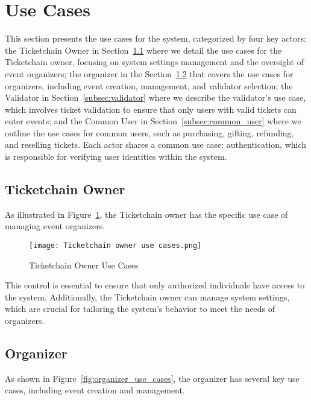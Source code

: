 \section{Use Cases}
\label{sec:use_cases}

This section presents the use cases for the system, categorized by four key
actors: the Ticketchain Owner in Section~\ref{subsec:ticketchain_owner} where
we detail the use cases for the Ticketchain owner, focusing on system settings
management and the oversight of event organizers; the organizer in the
Section~\ref{subsec:organizer} that covers the use cases for organizers,
including event creation, management, and validator selection; the Validator in
Section~\ref{subsec:validator} where we describe the validator's use case,
which involves ticket validation to ensure that only users with valid tickets
can enter events; and the Common User in Section~\ref{subsec:common_user} where
we outline the use cases for common users, such as purchasing, gifting,
refunding, and reselling tickets. Each actor shares a common use case:
authentication, which is responsible for verifying user identities within the
system.

\subsection{Ticketchain Owner}
\label{subsec:ticketchain_owner}

As illustrated in Figure~\ref{fig:ticketchain_owner_use_cases}, the Ticketchain
owner has the specific use case of managing event organizers.

\begin{figure}[H]
    \centering
    \texttt{[image: Ticketchain owner use cases.png]}
    \caption{Ticketchain Owner Use Cases}
    \label{fig:ticketchain_owner_use_cases}
\end{figure}

This control is essential to ensure that only authorized individuals have
access to the system. Additionally, the Ticketchain owner can manage system
settings, which are crucial for tailoring the system’s behavior to meet the
needs of organizers.

\subsection{Organizer}
\label{subsec:organizer}

As shown in Figure~\ref{fig:organizer_use_cases}, the organizer has several key
use cases, including event creation and management.

